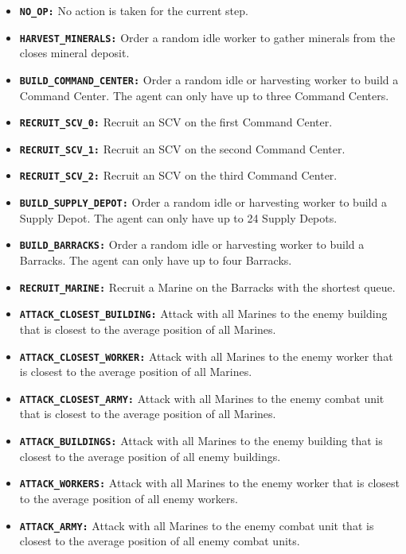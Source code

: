 \begin{itemize}
    \item \textbf{\texttt{NO\_OP:}} No action is taken for the current step.
    \item \textbf{\texttt{HARVEST\_MINERALS:}} Order a random idle worker to gather minerals from the closes mineral deposit.
    \item \textbf{\texttt{BUILD\_COMMAND\_CENTER:}} Order a random idle or harvesting worker to build a Command Center. The agent can only have up to three Command Centers.
    \item \textbf{\texttt{RECRUIT\_SCV\_0:}} Recruit an SCV on the first Command Center.
    \item \textbf{\texttt{RECRUIT\_SCV\_1:}} Recruit an SCV on the second Command Center.
    \item \textbf{\texttt{RECRUIT\_SCV\_2:}} Recruit an SCV on the third Command Center.
    \item \textbf{\texttt{BUILD\_SUPPLY\_DEPOT:}} Order a random idle or harvesting worker to build a Supply Depot. The agent can only have up to 24 Supply Depots.
    \item \textbf{\texttt{BUILD\_BARRACKS:}} Order a random idle or harvesting worker to build a Barracks. The agent can only have up to four Barracks.
    \item \textbf{\texttt{RECRUIT\_MARINE:}} Recruit a Marine on the Barracks with the shortest queue.
    \item \textbf{\texttt{ATTACK\_CLOSEST\_BUILDING:}} Attack with all Marines to the enemy building that is closest to the average position of all Marines.
    \item \textbf{\texttt{ATTACK\_CLOSEST\_WORKER:}} Attack with all Marines to the enemy worker that is closest to the average position of all Marines.
    \item \textbf{\texttt{ATTACK\_CLOSEST\_ARMY:}} Attack with all Marines to the enemy combat unit that is closest to the average position of all Marines.
    \item \textbf{\texttt{ATTACK\_BUILDINGS:}} Attack with all Marines to the enemy building that is closest to the average position of all enemy buildings.
    \item \textbf{\texttt{ATTACK\_WORKERS:}} Attack with all Marines to the enemy worker that is closest to the average position of all enemy workers.
    \item \textbf{\texttt{ATTACK\_ARMY:}} Attack with all Marines to the enemy combat unit that is closest to the average position of all enemy combat units.
\end{itemize}

